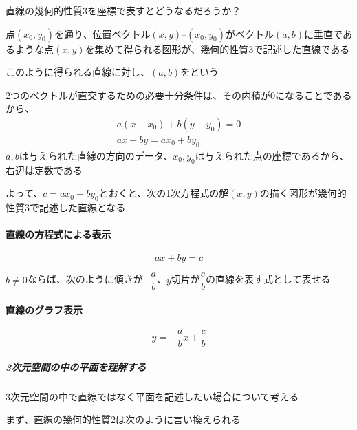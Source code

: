 \documentclass[../book_jiriki_calc]{subfiles}
\begin{document}
\sectionline

直線の幾何的性質3を座標で表すとどうなるだろうか？

\br

点$(x_0,y_0)$を通り、位置ベクトル$(x,y)$--$(x_0,y_0)$がベクトル$(a,b)$に垂直であるような点$(x,y)$を集めて得られる図形が、幾何的性質3で記述した直線である

このように得られる直線に対し、$(a,b)$をという

\br

2つのベクトルが直交するための必要十分条件は、その内積が0になることであるから、
\begin{gather}
  a(x-x_0) + b(y-y_0)  = 0 \\
  ax + by             = ax_0 + by_0
\end{gather}
$a,b$は与えられた直線の方向のデータ、$x_0,y_0$は与えられた点の座標であるから、右辺は定数である

\br

よって、$c=ax_0+by_0$とおくと、次の1次方程式の解$(x,y)$の描く図形が幾何的性質3で記述した直線となる

\br

\paragraph{直線の方程式による表示}

\begin{equation*}
  ax + by = c
\end{equation*}

\br

$b\neq 0$ならば、次のように傾きが$-\dfrac{a}{b}$、$y$切片が$\dfrac{c}{b}$の直線を表す式として表せる

\br

\paragraph{直線のグラフ表示}

\begin{equation*}
  y = -\frac{a}{b}x + \frac{c}{b}
\end{equation*}

\br

\sectionline

\subparagraph{3次元空間の中の平面を理解する}\quad

3次元空間の中で直線ではなく平面を記述したい場合について考える

\br

まず、直線の幾何的性質2は次のように言い換えられる
\end{document}
